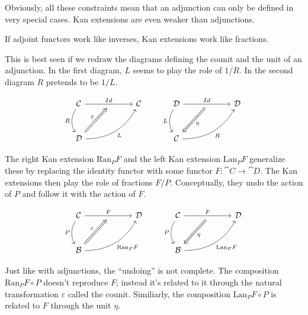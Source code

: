 \documentclass[DaoFP]{subfiles}
\begin{document}
Obviously, all these constraints mean that an adjunction can only be defined in very special cases. Kan extensions are even weaker than adjunctions. 

If adjoint functors work like inverses, Kan extensions work like fractions. 

This is best seen if we redraw the diagrams defining the counit and the unit of an adjunction. In the first diagram, $L$ seems to play the role of $1/R$. In the second diagram $R$ pretends to be $1/L$.

\[
 \begin{tikzcd} [row sep=1cm, column sep=1cm]
 \cat C
 \arrow[rr, "Id", "" {name=ID, below} ]
 \arrow[d, bend right, "R"']
 && \cat C
 \\
 \cat D
  \arrow[urr, bend right, "L"']
 \arrow[Rightarrow, "\varepsilon",  to=ID]
 \end{tikzcd}
 \qquad
 \begin{tikzcd} [row sep=1cm, column sep=1cm]
 \cat D
 \arrow[rr, "Id", "" {name=ID, below} ]
 \arrow[d, bend right, "L"']
 && \cat D
 \\
 \cat C
  \arrow[urr, bend right, "R"']
 \arrow[Rightarrow, "\eta",  from=ID]
 \end{tikzcd}
\]

The right Kan extension $\text{Ran}_P F$ and the left Kan extension $\text{Lan}_P F$ generalize these by replacing the identity functor with some functor $F \colon \cat C \to \cat D$. The Kan extensions then play the role of fractions $F/P$. Conceptually, they undo the action of $P$ and follow it with the action of $F$.

\[
 \begin{tikzcd} [row sep=1cm, column sep=1cm]
 \cat C
 \arrow[rr, "F", "" {name=ID, below} ]
 \arrow[d, bend right, "P"']
 && \cat D
 \\
 \cat B
  \arrow[urr, bend right, "\text{Ran}_P F"']
 \arrow[Rightarrow, "\varepsilon",  to=ID]
 \end{tikzcd}
 \qquad
 \begin{tikzcd} [row sep=1cm, column sep=1cm]
 \cat C
 \arrow[rr, "F", "" {name=ID, below} ]
 \arrow[d, bend right, "P"']
 && \cat D
 \\
 \cat B
  \arrow[urr, bend right, "\text{Lan}_P F"']
 \arrow[Rightarrow, "\eta",  from=ID]
 \end{tikzcd}
\]

Just like with adjunctions, the ``undoing'' is not complete. The composition $\text{Ran}_P F \circ P$ doesn't reproduce $F$; instead it's related to it through the natural transformation $\varepsilon$ called the counit. Similiarly, the composition $\text{Lan}_P F \circ P$ is related to $F$ through the unit $\eta$.
\end{document}
